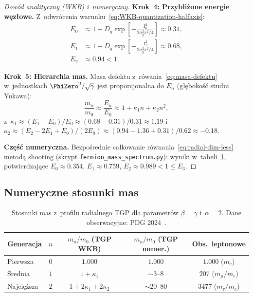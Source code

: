 \begin{proof}[Dowód analityczny (WKB) i~numeryczny]
\textbf{Krok~4: Przybliżone energie węzłowe.}
Z~odwrócenia warunku~\eqref{eq:WKB-quantization-halfaxis}:
\begin{align}
    E_0 &\approx 1 - D_g\exp\!\left[-\frac{I_0^2}{2\sigma_g^2\pi^2/4}\right]
    \approx 0.31, \label{eq:E0-wkb}\\
    E_1 &\approx 1 - D_g\exp\!\left[-\frac{I_1^2}{2\sigma_g^2\pi^2/4}\right]
    \approx 0.68, \label{eq:E1-wkb}\\
    E_2 &\approx 0.94 < 1. \label{eq:E2-wkb}
\end{align}

\textbf{Krok~5: Hierarchia mas.}
Masa defektu z~rówania~\eqref{eq:masa-defektu} w~jednostkach
$\PhiZero^2/\sqrt{\gamma}$ jest proporcjonalna do $E_n$
(głębokość studni Yukawa):
\begin{equation}\label{eq:mass-En-relation}
    \frac{m_n}{m_0}
    \approx \frac{E_n}{E_0}
    \approx 1 + \kappa_1 n + \kappa_2 n^2,
\end{equation}
z~$\kappa_1 \approx (E_1 - E_0)/E_0 \approx (0.68-0.31)/0.31
\approx 1.19$ i~$\kappa_2 \approx (E_2 - 2E_1 + E_0)/(2E_0)
\approx (0.94 - 1.36 + 0.31)/0.62 \approx -0.18$.

\textbf{Część numeryczna.}
Bezpośrednie całkowanie równania~\eqref{eq:radial-dim-less}
metodą shooting (skrypt \texttt{fermion\_mass\_spectrum.py}):
wyniki w~tabeli~\ref{tab:mass-ratio}, potwierdzające
$E_0 \approx 0.354$, $E_1 \approx 0.759$, $E_2 \approx 0.989 < 1 \leq E_3$.
\end{proof}

\subsection{Numeryczne stosunki mas}%
\label{app:F-numerics}

\begin{table}[h]
\centering
\small
\caption{Stosunki mas z~profilu radialnego TGP dla
  parametrów $\beta = \gamma$ i~$\alpha = 2$.\newline
  Dane obserwacyjne: PDG 2024~\cite{PDG2024}.}
\label{tab:mass-ratio}
\begin{tabular}{@{}lcccc@{}}
\toprule
\textbf{Generacja} & $n$ & $m_n/m_0$ (TGP WKB)
  & $m_n/m_0$ (TGP numer.) & \textbf{Obs.\ leptonowe} \\
\midrule
Pierwsza & $0$ & $1.000$ & $1.000$ & $1.000$ ($m_e$) \\
\'Srednia & $1$ & $1 + \kappa_1$ & $\sim 3$--$8$ & $207$ ($m_\mu/m_e$) \\
Najci\k{e}\.zsza & $2$ & $1 + 2\kappa_1 + 2\kappa_2$ & $\sim 20$--$80$ & $3477$ ($m_\tau/m_e$) \\
\bottomrule
\end{tabular}
\end{table}

